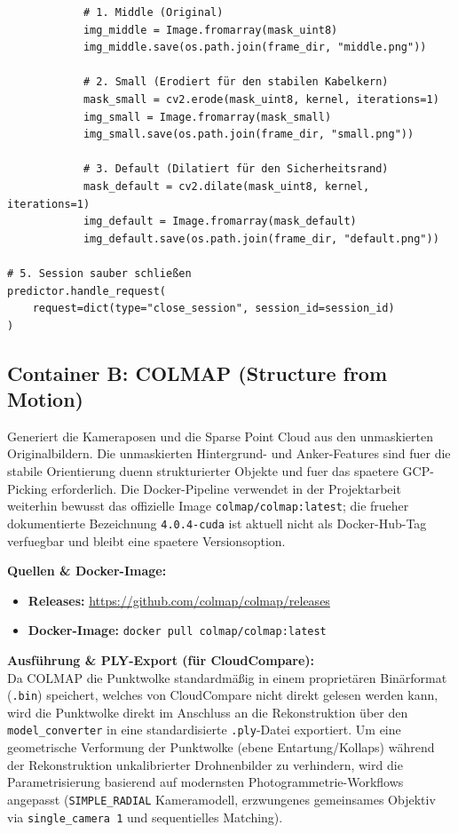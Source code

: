 \documentclass[12pt,a4paper]{article}
\begin{document}
\begin{verbatim}
            # 1. Middle (Original)
            img_middle = Image.fromarray(mask_uint8)
            img_middle.save(os.path.join(frame_dir, "middle.png"))
            
            # 2. Small (Erodiert für den stabilen Kabelkern)
            mask_small = cv2.erode(mask_uint8, kernel, iterations=1)
            img_small = Image.fromarray(mask_small)
            img_small.save(os.path.join(frame_dir, "small.png"))
            
            # 3. Default (Dilatiert für den Sicherheitsrand)
            mask_default = cv2.dilate(mask_uint8, kernel, iterations=1)
            img_default = Image.fromarray(mask_default)
            img_default.save(os.path.join(frame_dir, "default.png"))

# 5. Session sauber schließen
predictor.handle_request(
    request=dict(type="close_session", session_id=session_id)
)
\end{verbatim}

\subsection*{Container B: COLMAP (Structure from Motion)}
Generiert die Kameraposen und die Sparse Point Cloud aus den unmaskierten
Originalbildern. Die unmaskierten Hintergrund- und Anker-Features sind fuer
die stabile Orientierung duenn strukturierter Objekte und fuer das spaetere
GCP-Picking erforderlich. Die Docker-Pipeline verwendet in der Projektarbeit
weiterhin bewusst das offizielle Image \texttt{colmap/colmap:latest}; die
frueher dokumentierte Bezeichnung \texttt{4.0.4-cuda} ist aktuell nicht als
Docker-Hub-Tag verfuegbar und bleibt eine spaetere Versionsoption.

\textbf{Quellen \& Docker-Image:}
\begin{itemize}[noitemsep]
    \item \textbf{Releases:} \url{https://github.com/colmap/colmap/releases}
    \item \textbf{Docker-Image:} \texttt{docker pull colmap/colmap:latest}
\end{itemize}

\textbf{Ausführung \& PLY-Export (für CloudCompare):}\\
Da COLMAP die Punktwolke standardmäßig in einem proprietären Binärformat (\texttt{.bin}) speichert, welches von CloudCompare nicht direkt gelesen werden kann, wird die Punktwolke direkt im Anschluss an die Rekonstruktion über den \texttt{model\_converter} in eine standardisierte \texttt{.ply}-Datei exportiert. Um eine geometrische Verformung der Punktwolke (ebene Entartung/Kollaps) während der Rekonstruktion unkalibrierter Drohnenbilder zu verhindern, wird die Parametrisierung basierend auf modernsten Photogrammetrie-Workflows angepasst (\texttt{SIMPLE\_RADIAL} Kameramodell, erzwungenes gemeinsames Objektiv via \texttt{single\_camera 1} und sequentielles Matching).
\end{document}
